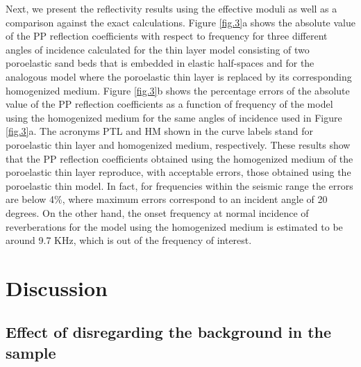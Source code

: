 \documentclass[draft]{agujournal2019}
\begin{document}

Next, we present the reflectivity results using the effective moduli as well as a comparison against the exact calculations. 
Figure \ref{fig.3}a shows the absolute value of the PP reflection coefficients with respect to frequency for three different angles of incidence calculated for the  thin layer model consisting of two poroelastic sand beds that is embedded in elastic half-spaces and for the analogous model where the poroelastic thin layer is replaced by its corresponding homogenized medium.  
Figure \ref{fig.3}b shows the percentage errors of the absolute value of the PP reflection coefficients as a function of frequency of the model using the homogenized medium for the same angles of incidence used in Figure \ref{fig.3}a. The acronyms PTL and HM shown in the curve labels stand for poroelastic thin layer and homogenized medium, respectively. 
These results show that the PP reflection coefficients obtained using the homogenized medium of the poroelastic thin layer reproduce, with acceptable errors, those obtained using the poroelastic thin model. In fact, for frequencies within the seismic range the errors are below 4\%, where maximum errors correspond to an incident angle of 20 degrees. On the other hand, the onset frequency at normal incidence of reverberations for the model using the homogenized medium is estimated to be around 9.7 KHz, which is out of the frequency of interest.
\section{Discussion}

\subsection{Effect of disregarding the background in the sample}
\end{document}
